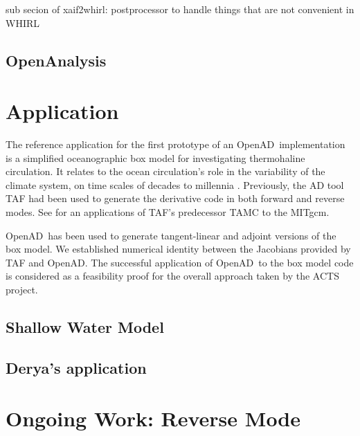 \documentclass[acmtocl,acmnow]{acmtrans2m}
\newcommand{\OpenAD}{OpenAD}
\newcommand{\OpenAnalysis}{OpenAnalysis}
\begin{document}
sub secion of xaif2whirl: postprocessor to handle things that are not
convenient in WHIRL


\subsection{\OpenAnalysis} 



\section{Application}

The reference application for the first prototype of an \OpenAD\ implementation
is a simplified oceanographic box model for investigating
thermohaline circulation. It relates to the
ocean circulation's role in the variability of the climate system,
on time scales of decades to millennia \cite{tzi-ioa:02}.
Previously, the AD tool TAF \cite{GiKa02} 
had been used to generate the derivative
code in both forward and reverse modes.
See \cite{maro-eta:99} for an applications of
TAF's predecessor TAMC to the MITgcm.

\OpenAD\ has been used to generate tangent-linear and 
adjoint versions of the box model. We established numerical identity between
the Jacobians provided by TAF and \OpenAD.
The successful 
application of \OpenAD\ to the box model code is considered as a feasibility 
proof for the overall approach taken by the ACTS project.  
\subsection{Shallow Water Model}
\subsection{Derya's application}

\section*{Ongoing Work: Reverse Mode}
\end{document}
